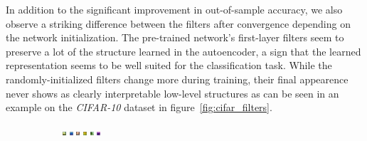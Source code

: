 \documentclass{article}
\begin{document}
    In addition to the significant improvement in out-of-sample accuracy, we also observe a striking difference between the filters after convergence depending on the network initialization. The pre-trained network's first-layer filters seem to preserve a lot of the structure learned in the autoencoder, a sign that the learned representation seems to be well suited for the classification task. While the randomly-initialized filters change more during training, their final appearence never shows as clearly interpretable low-level structures as can be seen in an example on the \emph{CIFAR-10} dataset in figure~\ref{fig:cifar_filters}.

      \begin{figure}
          \centering

            \begin{subfigure}{.4\linewidth}
              \centering
              \includegraphics[width=0.1\linewidth]{../graphics/cifar_filters/pre_trained_01.png} 
              \includegraphics[width=0.1\linewidth]{../graphics/cifar_filters/pre_trained_02.png} %
              \includegraphics[width=0.1\linewidth]{../graphics/cifar_filters/pre_trained_03.png}
              \includegraphics[width=0.1\linewidth]{../graphics/cifar_filters/pre_trained_04.png} %
              \includegraphics[width=0.1\linewidth]{../graphics/cifar_filters/pre_trained_05.png} %
              \includegraphics[width=0.1\linewidth]{../graphics/cifar_filters/pre_trained_06.png} \\

\end{subfigure}
\end{figure}
\end{document}
